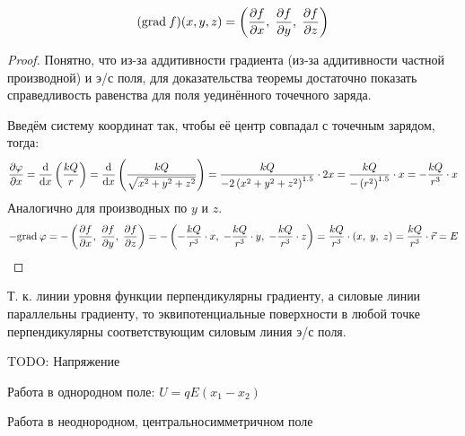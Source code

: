 \[ (\mathrm{grad}\: f)(x, y, z) = \left( \frac{\partial f}{\partial x},\;\frac{\partial f}{\partial y},\;\frac{\partial f}{\partial z} \right) \]

\begin{proof}
	Понятно, что из-за аддитивности градиента (из-за аддитивности частной производной) и э/с поля, для доказательства теоремы достаточно показать справедливость равенства для поля уединённого точечного заряда.\par
	Введём систему координат так, чтобы её центр совпадал с точечным зарядом, тогда:
	\[ \frac{\partial \varphi}{\partial x} = \frac{\text{d}}{\text{d} x} \left( \frac{kQ}{r} \right) = \frac{\text{d}}{\text{d} x} \left( \frac{kQ}{\sqrt{x^2+y^2+z^2}} \right) = \frac{kQ}{-2 \left( x^2 + y^2 + z^2 \right)^{1.5}} \cdot 2x = \frac{kQ}{-\left( r^2 \right)^{1.5}} \cdot x = -\frac{kQ}{r^3} \cdot x\]
	Аналогично для производных по $y$ и $z$.
	\[ -\mathrm{grad}\: \varphi = -\left( \frac{\partial f}{\partial x},\;\frac{\partial f}{\partial y},\;\frac{\partial f}{\partial z} \right) = -\left( -\frac{kQ}{r^3} \cdot x,\; -\frac{kQ}{r^3} \cdot y,\; -\frac{kQ}{r^3} \cdot z \right) = \frac{kQ}{r^3} \cdot (x,\; y,\; z) = \frac{kQ}{r^3} \cdot \vec{r} = E \]
\end{proof}

Т. к. линии уровня функции перпендикулярны градиенту, а силовые линии параллельны градиенту, то эквипотенциальные поверхности в любой точке перпендикулярны соответствующим силовым линия э/с поля.

TODO:
Напряжение\par
Работа в однородном поле: $U = qE(x_1 - x_2)$ \par
Работа в неоднородном, центральносимметричном поле \par
